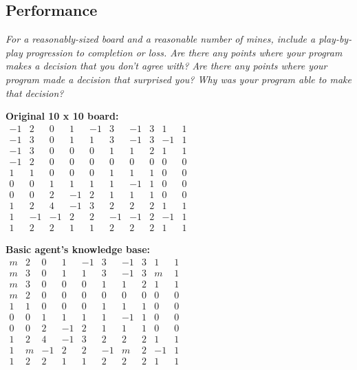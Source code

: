 \documentclass[11pt]{article} %
\begin{document}
\subsection{Performance}

\textit{For a reasonably-sized board and a reasonable number of mines, include a play-by-play progression to completion or loss. Are there any points where your program makes a decision that you don’t agree with? Are there any points where your program made a decision that surprised you? Why was your program able to make that decision?}\\

\begin{center}
\textbf{Original 10 x 10 board:}\\
$\begin{matrix}
-1 & 2 & 0 & 1 & -1 & 3 & -1 & 3 & 1 & 1\\
-1 & 3 & 0 & 1 & 1 & 3 & -1 & 3 & -1 & 1\\
-1 & 3 & 0 & 0 & 0 & 1 & 1 & 2 & 1 & 1\\
-1 & 2 & 0 & 0 & 0 & 0 & 0 & 0 & 0 & 0\\
1 & 1 & 0 & 0 & 0 & 1 & 1 & 1 & 0 & 0\\
0 & 0 & 1 & 1 & 1 & 1 & -1 & 1 & 0 & 0\\
0 & 0 & 2 & -1 & 2 & 1 & 1 & 1 & 0 & 0\\
1 & 2 & 4 & -1 & 3 & 2 & 2 & 2 & 1 & 1\\
1 & -1 & -1 & 2 & 2 & -1 & -1 & 2 & -1 & 1\\
1 & 2 & 2 & 1 & 1 & 2 & 2 & 2 & 1 & 1
\end{matrix}$

\textbf{Basic agent's knowledge base:}\\
$\begin{matrix}
m & 2 & 0 & 1 & -1 & 3 & -1 & 3 & 1 & 1\\
m & 3 & 0 & 1 & 1 & 3 & -1 & 3 & m & 1\\
m & 3 & 0 & 0 & 0 & 1 & 1 & 2 & 1 & 1\\
m & 2 & 0 & 0 & 0 & 0 & 0 & 0 & 0 & 0\\
1 & 1 & 0 & 0 & 0 & 1 & 1 & 1 & 0 & 0\\
0 & 0 & 1 & 1 & 1 & 1 & -1 & 1 & 0 & 0\\
0 & 0 & 2 & -1 & 2 & 1 & 1 & 1 & 0 & 0\\
1 & 2 & 4 & -1 & 3 & 2 & 2 & 2 & 1 & 1\\
1 & m & -1 & 2 & 2 & -1 & m & 2 & -1 & 1\\
1 & 2 & 2 & 1 & 1 & 2 & 2 & 2 & 1 & 1
\end{matrix}$


\end{center}
\end{document}
